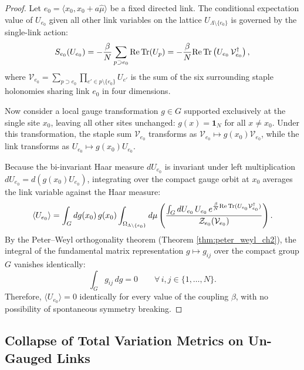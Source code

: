 \begin{proof}
Let $e_0 = \langle x_0, x_0 + a\hat{\mu} \rangle$ be a fixed directed link. The conditional expectation value of $U_{e_0}$ given all other link variables on the lattice $U_{\Lambda \setminus \{e_0\}}$ is governed by the single-link action:
\begin{equation}
S_{e_0}(U_{e_0}) = -\frac{\beta}{N} \sum_{p \supset e_0} \mathrm{Re} \, \mathrm{Tr}(U_p) = -\frac{\beta}{N} \mathrm{Re} \, \mathrm{Tr}\left( U_{e_0} \, \mathcal{V}_{e_0}^\dagger \right),
\end{equation}
where $\mathcal{V}_{e_0} = \sum_{p \supset e_0} \prod_{e' \in p \setminus \{e_0\}} U_{e'}$ is the sum of the six surrounding staple holonomies sharing link $e_0$ in four dimensions.

Now consider a local gauge transformation $g \in G$ supported exclusively at the single site $x_0$, leaving all other sites unchanged: $g(x) = \mathbf{1}_N$ for all $x \ne x_0$. Under this transformation, the staple sum $\mathcal{V}_{e_0}$ transforms as $\mathcal{V}_{e_0} \mapsto g(x_0) \mathcal{V}_{e_0}$, while the link transforms as $U_{e_0} \mapsto g(x_0) U_{e_0}$. 

Because the bi-invariant Haar measure $dU_{e_0}$ is invariant under left multiplication $dU_{e_0} = d(g(x_0) U_{e_0})$, integrating over the compact gauge orbit at $x_0$ averages the link variable against the Haar measure:
\begin{equation}
\langle U_{e_0} \rangle = \int_G dg(x_0) \, g(x_0) \int_{\Omega_{\Lambda \setminus \{e_0\}}} d\mu \left( \frac{\int_G dU_{e_0} \, U_{e_0} \, e^{\frac{\beta}{N}\mathrm{Re}\,\mathrm{Tr}(U_{e_0} \mathcal{V}_{e_0}^\dagger)}}{\mathcal{Z}_{e_0}(\mathcal{V}_{e_0})} \right).
\end{equation}
By the Peter--Weyl orthogonality theorem (Theorem \ref{thm:peter_weyl_ch2}), the integral of the fundamental matrix representation $g \mapsto g_{ij}$ over the compact group $G$ vanishes identically:
\begin{equation}
\int_G g_{ij} \, dg = 0 \qquad \forall \, i, j \in \{1, \dots, N\}.
\end{equation}
Therefore, $\langle U_{e_0} \rangle = 0$ identically for every value of the coupling $\beta$, with no possibility of spontaneous symmetry breaking.
\end{proof}

\subsection{Collapse of Total Variation Metrics on Un-Gauged Links}
\label{subsec:collapse_variation_links}

